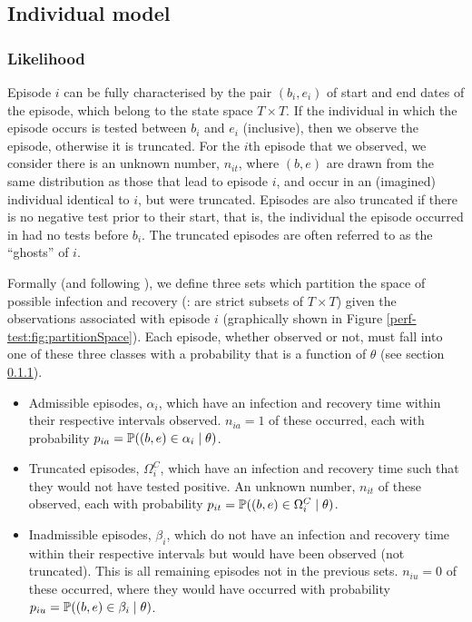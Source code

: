 \documentclass[thesis.tex]{subfiles}
\begin{document}
\subsection{Individual model}\label{perf-test:sec:individual-model}

\subsubsection{Likelihood}\label{perf-test:sec:likelihood}

Episode $i$ can be fully characterised by the pair $(b_i, e_i)$ of
start and end dates of the episode, which belong to the state space
$T \times T$. If the individual in which the episode occurs is tested
between $b_i$ and $e_i$ (inclusive), then we observe the episode,
otherwise it is truncated. For the $i$th episode that we observed, we
consider there is an unknown number, $n_{it}$, where $(b, e)$ are
drawn from the same distribution as those that lead to episode $i$,
and occur in an (imagined) individual identical to $i$, but were
truncated. Episodes are also truncated if there is no negative test
prior to their start, that is, the individual the episode occurred in
had no tests before $b_i$. The truncated episodes are often referred
to as the ``ghosts'' of $i$.

Formally (and following \textcite{heiseyModelling}), we
define three sets which partition the space of possible infection and
recovery (\ie: are strict subsets of $T \times T$) given the
observations associated with episode $i$ (graphically shown in Figure
\ref{perf-test:fig:partitionSpace}). Each episode, whether observed or not, must
fall into one of these three classes with a probability that is a
function of $\theta$ (see section \ref{perf-test:sec:likelihood}).

\begin{itemize}
\item
  Admissible episodes, $\alpha_i$, which have an infection and
  recovery time within their respective intervals observed.
  $n_{ia} =1$ of these occurred, each with probability
  $p_{ia} = \operatorname{\mathbb{P}}((b, e) \in \alpha_i \mid \theta)$.
\item
  Truncated episodes, $\Omega_i^C$, which have an infection and
  recovery time such that they would not have tested positive. An
  unknown number, $n_{it}$ of these observed, each with probability
  $p_{it} = \operatorname{\mathbb{P}}((b, e) \in \Omega^C_i \mid \theta)$.
\item
  Inadmissible episodes, $\beta_i$, which do not have an infection and
  recovery time within their respective intervals but would have been
  observed (not truncated). This is all remaining episodes not in the
  previous sets. $n_{iu} = 0$ of these occurred, where they would have
  occurred with probability
  $p_{iu} = \operatorname{\mathbb{P}}((b, e) \in \beta_i \mid \theta)$.
\end{itemize}
\end{document}
